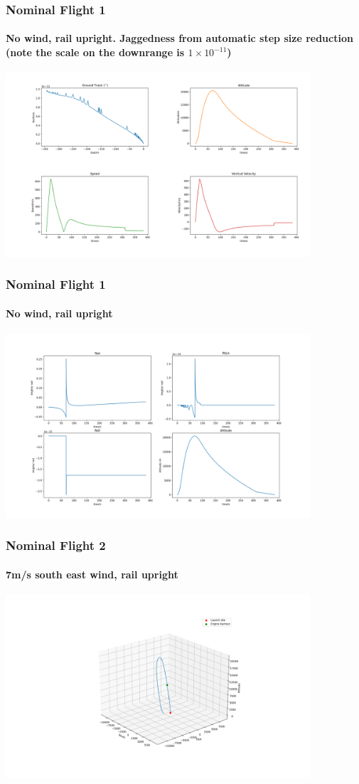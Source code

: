 \documentclass{beamer}
\begin{document}
    \begin{frame}
        \frametitle{Nominal Flight 1}
        \framesubtitle{No wind, rail upright. Jaggedness from automatic step size reduction (note the scale on the downrange is $1\times10^{-11}$)}
        \includegraphics[width=0.85\textwidth]{images/example1a.png}
    \end{frame}
    \begin{frame}
        \frametitle{Nominal Flight 1}
        \framesubtitle{No wind, rail upright}
        \includegraphics[width=0.85\textwidth]{images/example1b.png}
    \end{frame}
    \begin{frame}
        \frametitle{Nominal Flight 2}
        \framesubtitle{7m/s south east wind, rail upright}
        \includegraphics[width=0.85\textwidth]{images/example2.png}
    \end{frame}
\end{document}
